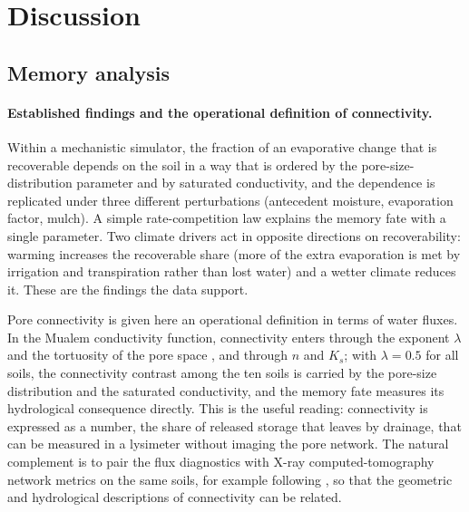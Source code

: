 \documentclass[preprint,12pt,authoryear]{elsarticle}
\begin{document}
\section{Discussion}
\subsection{Memory analysis}
\label{sec:disc}
\paragraph{Established findings and the operational definition of connectivity.}
Within a mechanistic simulator, the fraction of an evaporative change that is recoverable depends on the soil in a way that is ordered by the pore-size-distribution parameter and by saturated conductivity, and the dependence is replicated under three different perturbations (antecedent moisture, evaporation factor, mulch). A simple rate-competition law explains the memory fate with a single parameter. Two climate drivers act in opposite directions on recoverability: warming increases the recoverable share (more of the extra evaporation is met by irrigation and transpiration rather than lost water) and a wetter climate reduces it. These are the findings the data support.

Pore connectivity is given here an operational definition in terms of water fluxes. In the Mualem conductivity function, connectivity enters through the exponent $\lambda$ and the tortuosity of the pore space \citep{Mualem1976,Ghanbarian2013}, and through $n$ and $K_s$; with $\lambda=0.5$ for all soils, the connectivity contrast among the ten soils is carried by the pore-size distribution and the saturated conductivity, and the memory fate measures its hydrological consequence directly. This is the useful reading: connectivity is expressed as a number, the share of released storage that leaves by drainage, that can be measured in a lysimeter without imaging the pore network. The natural complement is to pair the flux diagnostics with X-ray computed-tomography network metrics on the same soils, for example following \citet{Leuther2024}, so that the geometric and hydrological descriptions of connectivity can be related.
\end{document}
